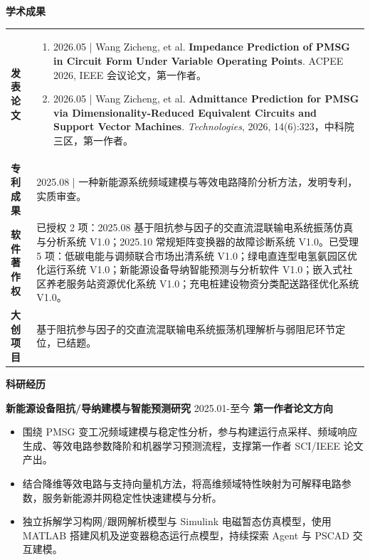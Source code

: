 \documentclass[UTF8,a4paper,10pt]{ctexart}
\newcommand{\sectiontitle}[1]{%
  \vspace{0.48em}
  {\sffamily\bfseries\Large\color{resumeblue}#1}\par
  \vspace{-0.28em}{\color{resumeblue}\rule{2.35cm}{1.05pt}}{\color{softline}\rule{\dimexpr\linewidth-2.35cm\relax}{1.05pt}}\vspace{0.13em}
}
\newcommand{\entryhead}[3]{\textbf{#1} \hfill #2 \hfill \textbf{#3}}
\begin{document}
\sectiontitle{学术成果}
\begin{tabularx}{\linewidth}{L{2.25cm}Y}
\textbf{发表论文} &
\begin{enumerate}
  \item 2026.05 | Wang Zicheng, et al. \textbf{Impedance Prediction of PMSG in Circuit Form Under Variable Operating Points}. ACPEE 2026, IEEE 会议论文，第一作者。
  \item 2026.05 | Wang Zicheng, et al. \textbf{Admittance Prediction for PMSG via Dimensionality-Reduced Equivalent Circuits and Support Vector Machines}. \textit{Technologies}, 2026, 14(6):323，中科院三区，第一作者。
\end{enumerate}\\[-0.55em]
\textbf{专利成果} & 2025.08 | 一种新能源系统频域建模与等效电路降阶分析方法，发明专利，实质审查。\\
\textbf{软件著作权} & 已授权 2 项：2025.08 基于阻抗参与因子的交直流混联输电系统振荡仿真与分析系统 V1.0；2025.10 常规矩阵变换器的故障诊断系统 V1.0。已受理 5 项：低碳电能与调频联合市场出清系统 V1.0；绿电直连型电氢氨园区优化运行系统 V1.0；新能源设备导纳智能预测与分析软件 V1.0；嵌入式社区养老服务站资源优化系统 V1.0；充电桩建设物资分类配送路径优化系统 V1.0。\\
\textbf{大创项目} & 基于阻抗参与因子的交直流混联输电系统振荡机理解析与弱阻尼环节定位，已结题。\\
\end{tabularx}

\sectiontitle{科研经历}
\entryhead{新能源设备阻抗/导纳建模与智能预测研究}{2025.01-至今}{第一作者论文方向}
\begin{itemize}
  \item 围绕 PMSG 变工况频域建模与稳定性分析，参与构建运行点采样、频域响应生成、等效电路参数降阶和机器学习预测流程，支撑第一作者 SCI/IEEE 论文产出。
  \item 结合降维等效电路与支持向量机方法，将高维频域特性映射为可解释电路参数，服务新能源并网稳定性快速建模与分析。
  \item 独立拆解学习构网/跟网解析模型与 Simulink 电磁暂态仿真模型，使用 MATLAB 搭建风机及逆变器稳态运行点模型，持续探索 Agent 与 PSCAD 交互建模。
\end{itemize}
\end{document}
